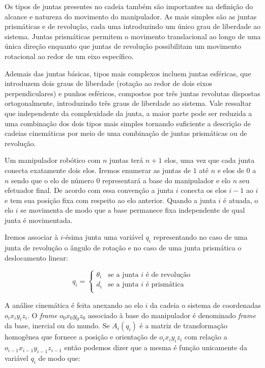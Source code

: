 Os tipos de juntas presentes no cadeia também são importantes na definição do
alcance e natureza do movimento do manipulador. As mais simples são as juntas
prismáticas e de revolução, cada uma introduzindo um único grau de liberdade ao
sistema. Juntas prismáticas permitem o movimento translacional ao longo de uma
única direção enquanto que juntas de revolução possibilitam um movimento
rotacional ao redor de um eixo específico.

Ademais das juntas básicas, tipos mais complexos incluem juntas esféricas, que
introduzem dois graus de liberdade (rotação ao redor de dois eixos
perpendiculares) e punhos esféricos, compostos por três juntas revolutas
dispostas ortogonalmente, introduzindo três graus de liberdade ao sistema. Vale
ressaltar que independente da complexidade da junta, a maior parte pode ser
reduzida a uma combinação dos dois tipos mais simples tornando suficiente a
descrição de cadeias cinemáticas por meio de uma combinação de juntas
prismáticas ou de revolução.

Um manipulador robótico com $n$ juntas terá $n + 1$ elos, uma vez que cada
junta conecta exatamente dois elos. Iremos enumerar as juntas de $1$ até $n$ e
elos de $0$ a $n$ sendo que o elo de número $0$ representará a base do
manipulador e elo $n$ seu efetuador final. De acordo com essa convenção a junta
$i$ conecta os elos $i - 1$ ao $i$ e tem sua posição fixa com respeito ao elo
anterior. Quando a junta $i$ é atuada, o elo $i$ se movimenta de modo que a
base permanece fixa independente de qual junta é movimentada.

Iremos associar à $i$-ésima junta uma variável $q_i$ representando no caso de
uma junta de revolução o ângulo de rotação e no caso de uma junta prismática o
deslocamento linear:

\begin{equation}
    q_i =
    \begin{cases}
        \theta_i & \text{se a junta $i$ é de revolução} \\
        d_i      & \text{se a junta $i$ é prismática}   \\
    \end{cases}
\end{equation}

A análise cinemática é feita anexando ao elo $i$ da cadeia o sistema de
coordenadas $o_i x_i y_i z_i$. O \emph{frame} $o_0 x_0 y_0 z_0$ associado à
base do manipulador é denominado \emph{frame} da base, inercial ou do mundo. Se
$A_i(q_i)$ é a matriz de transformação homogênea que fornece a posição e
orientação de $o_i x_i y_i z_i$ com relação a $o_{i-1} x_{i-1} y_{i-1} z_{i-1}$
então podemos dizer que a mesma é função unicamente da variável $q_i$ de modo
que:

